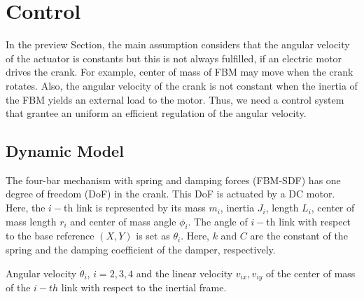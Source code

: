 \documentclass[12pt,letterpape]{article}
\begin{document}
		

\section{Control} %
\label{sec:control}

In the preview Section, the main assumption considers that the angular velocity
of the actuator is constants but this is not always fulfilled, if an electric motor
drives the crank. For example, center of mass of FBM may move when the crank rotates.
Also, the angular velocity of the crank is not constant when the inertia of the 
FBM yields an external load to the motor. Thus, we need a control system that grantee 
an uniform an efficient regulation of the angular velocity.

\subsection{Dynamic Model} %
\label{sub:dynamic_model}

The four-bar mechanism with spring and damping forces (FBM-SDF) has one degree of
freedom (DoF) in the crank. This DoF is actuated by a DC motor. Here, the $i-$th link is represented by its mass $m_i$, inertia $J_i$, length $L_i$, center of mass
length $r_i$ and center of mass angle $\phi_i$. The angle of $i-$th link with respect to the base reference $(X, Y)$ is set as $\theta_i$. Here, $k$ and $C$ are the constant
of the spring and the damping coefficient of the damper, respectively.

Angular velocity $\dot{\theta}_i$, $ i = 2,3,4$ and the linear velocity $v_{ix},v_{iy}$
of the center of mass of the $i-th$ link with respect to the inertial frame.
\end{document}
